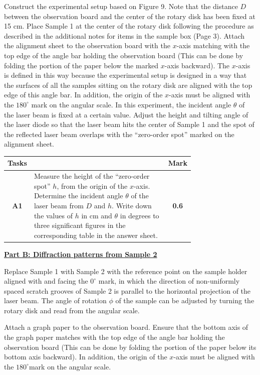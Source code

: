Construct the experimental setup based on Figure 9. Note that the distance $D$ between the observation board and the center of the rotary disk has been fixed at 15 cm. Place Sample 1 at the center of the rotary disk following the procedure as described in the additional notes for items in the sample box (Page 3). Attach the alignment sheet to the observation board with the $x$-axis matching with the top edge of the angle bar holding the observation board (This can be done by folding the portion of the paper below the marked $x$-axis backward). The $x$-axis is defined in this way because the experimental setup is designed in a way that the surfaces of all the samples sitting on the rotary disk are aligned with the top edge of this angle bar. In addition, the origin of the $x$-axis must be aligned with the $180^{\circ}$ mark on the angular scale. In this experiment, the incident angle $\theta$ of the laser beam is fixed at a certain value. Adjust the height and tilting angle of the laser diode so that the laser beam hits the center of Sample 1 and the spot of the reflected laser beam overlaps with the ``zero-order spot'' marked on the alignment sheet.

\noindent\begin{tabular}{|c|p{0.74\linewidth}|c|}
\hline
\textbf{Tasks} & & \textbf{Mark} \\ \hline
\textbf{A1} & Measure the height of the ``zero-order spot'' $h$, from the origin of the $x$-axis. Determine the incident angle $\theta$ of the laser beam from $D$ and $h$. Write down the values of $h$ in cm and $\theta$ in degrees to three significant figures in the corresponding table in the answer sheet. & \textbf{0.6} \\ \hline
\end{tabular}

\underline{\textbf{Part B: Diffraction patterns from Sample 2}}

Replace Sample 1 with Sample 2 with the reference point on the sample holder aligned with and facing the $0^{\circ}$ mark, in which the direction of non-uniformly spaced scratch grooves of Sample 2 is parallel to the horizontal projection of the laser beam. The angle of rotation $\phi$ of the sample can be adjusted by turning the rotary disk and read from the angular scale.

Attach a graph paper to the observation board. Ensure that the bottom axis of the graph paper matches with the top edge of the angle bar holding the observation board (This can be done by folding the portion of the paper below its bottom axis backward). In addition, the origin of the $x$-axis must be aligned with the $180^{\circ}$mark on the angular scale.

